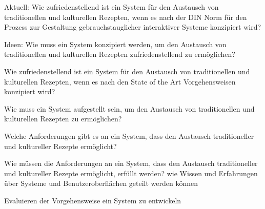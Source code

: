 

Aktuell: 
Wie zufriedenstellend ist ein System für den Austausch von traditionellen und kulturellen Rezepten, wenn es nach der DIN Norm für den Prozess zur Gestaltung gebrauchstauglicher interaktiver Systeme konzipiert wird?

Ideen:
Wie muss ein System konzipiert werden, um den Austausch von traditionellen und kulturellen Rezepten zufriedenstellend zu ermöglichen?

Wie zufriedenstellend ist ein System für den Austausch von traditionellen und kulturellen Rezepten, wenn es nach den State of the 
Art Vorgehensweisen konzipiert wird?

Wie muss ein System aufgestellt sein, um den Austausch von traditionellen und kulturellen Rezepten zu ermöglichen?

Welche Anforderungen gibt es an ein System, dass den Austausch traditioneller und kultureller Rezepte ermöglicht?

Wie müssen die Anforderungen an ein System, dass den Austausch traditioneller und kultureller Rezepte ermöglicht, erfüllt werden?
wie Wissen und Erfahrungen über Systeme und Benutzeroberflächen geteilt werden können

Evaluieren der Vorgehensweise ein System zu entwickeln